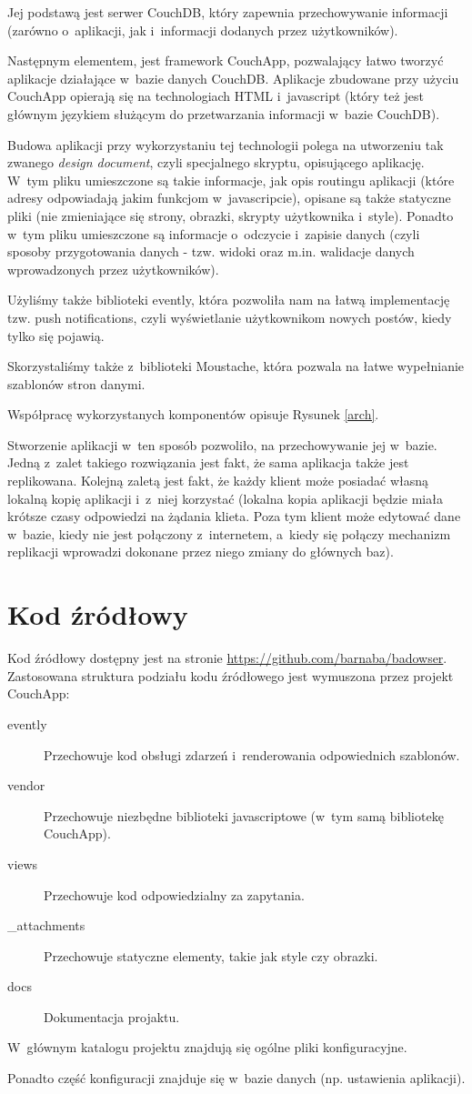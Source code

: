 \documentclass[a4paper]{article}
\begin{document}
Jej podstawą jest serwer CouchDB, który zapewnia przechowywanie informacji (zarówno o~aplikacji, jak i~informacji dodanych przez użytkowników).

Następnym elementem, jest framework CouchApp, pozwalający łatwo tworzyć aplikacje działające w~bazie danych CouchDB.
Aplikacje zbudowane przy użyciu CouchApp opierają się na technologiach HTML i~javascript (który też jest głównym językiem służącym do przetwarzania informacji w~bazie CouchDB).

Budowa aplikacji przy wykorzystaniu tej technologii polega na utworzeniu tak zwanego \emph{design document}, czyli specjalnego skryptu, opisującego aplikację.
W~tym pliku umieszczone są takie informacje, jak opis routingu aplikacji (które adresy odpowiadają jakim funkcjom w~javascripcie),
opisane są także statyczne pliki (nie zmieniające się strony, obrazki, skrypty użytkownika i~style).
Ponadto w~tym pliku umieszczone są informacje o~odczycie i~zapisie danych (czyli sposoby przygotowania danych - tzw. widoki oraz m.in. walidacje danych wprowadzonych przez użytkowników).

Użyliśmy także biblioteki evently, która pozwoliła nam na łatwą implementację tzw. push notifications, czyli wyświetlanie użytkownikom nowych postów, kiedy tylko się pojawią.

Skorzystaliśmy także z~biblioteki Moustache, która pozwala na łatwe wypełnianie szablonów stron danymi.

Współpracę wykorzystanych komponentów opisuje Rysunek \ref{arch}.

Stworzenie aplikacji w~ten sposób pozwoliło, na przechowywanie jej w~bazie. Jedną z~zalet takiego rozwiązania jest fakt, że sama aplikacja także jest replikowana.
Kolejną zaletą jest fakt, że każdy klient może posiadać własną lokalną kopię aplikacji i~z~niej korzystać (lokalna kopia aplikacji będzie miała krótsze czasy odpowiedzi na żądania klieta. 
Poza tym klient może edytować dane w~bazie, kiedy nie jest połączony z~internetem, a~kiedy się połączy mechanizm replikacji wprowadzi dokonane przez niego zmiany do głównych baz).

\section{Kod źródłowy}
Kod źródłowy dostępny jest na stronie \url{https://github.com/barnaba/badowser}.
Zastosowana struktura podziału kodu źródłowego jest wymuszona przez projekt CouchApp:
\begin{description}
  \item[evently] Przechowuje kod obsługi zdarzeń i~renderowania odpowiednich szablonów.
  \item[vendor] Przechowuje niezbędne biblioteki javascriptowe (w~tym samą bibliotekę CouchApp).
  \item[views] Przechowuje kod odpowiedzialny za zapytania.
  \item[\_attachments] Przechowuje statyczne elementy, takie jak style czy obrazki.
  \item[docs] Dokumentacja projaktu.
\end{description}
W~głównym katalogu projektu znajdują się ogólne pliki konfiguracyjne.

Ponadto część konfiguracji znajduje się w~bazie danych (np. ustawienia aplikacji).
\end{document}
